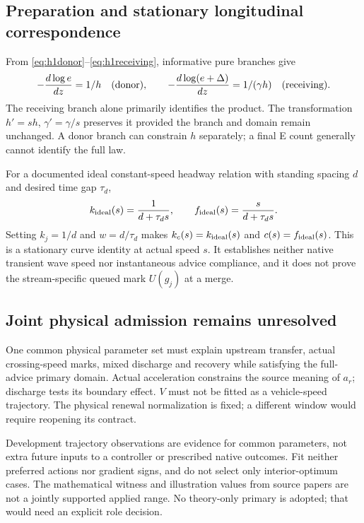 \subsection{Preparation and stationary longitudinal correspondence}
From \eqref{eq:h1donor}--\eqref{eq:h1receiving}, informative pure branches
give
\begin{equation}
 -\frac{d\log e}{dz}=1/h\quad\hbox{(donor)},\qquad
 -\frac{d\log(e+\Delta)}{dz}=1/(\gamma h)\quad\hbox{(receiving)}.
 \label{eq:prepidentify}
\end{equation}
The receiving branch alone primarily identifies the product. The
transformation $h'=sh$, $\gamma'=\gamma/s$ preserves it provided the
branch and domain remain unchanged. A donor branch can constrain $h$
separately; a final E count generally cannot identify the full law.

For a documented ideal constant-speed headway relation with standing
spacing $d$ and desired time gap $\tau_d$,
\begin{equation}
 k_{\rm ideal}(s)=\frac1{d+\tau_ds},\qquad
 f_{\rm ideal}(s)=\frac{s}{d+\tau_ds}. \label{eq:headway}
\end{equation}
Setting $k_j=1/d$ and $w=d/\tau_d$ makes
$k_c(s)=k_{\rm ideal}(s)$ and $c(s)=f_{\rm ideal}(s)$. This is a
stationary curve identity at actual speed $s$. It establishes neither
native transient wave speed nor instantaneous advice compliance, and it
does not prove the stream-specific queued mark $U(g_j)$ at a merge.

\subsection{Joint physical admission remains unresolved}
One common physical parameter set must explain upstream transfer, actual
crossing-speed marks, mixed discharge and recovery while satisfying the
full-advice primary domain. Actual acceleration constrains the source
meaning of $a_r$; discharge tests its boundary effect. $V$ must not be
fitted as a vehicle-speed trajectory. The physical renewal normalization
is fixed; a different window would require reopening its contract.

Development trajectory observations are evidence for common parameters,
not extra future inputs to a controller or prescribed native outcomes.
Fit neither preferred actions nor gradient signs, and do not select only
interior-optimum cases. The mathematical witness and illustration values
from source papers are not a jointly supported applied range. No
theory-only primary is adopted; that would need an explicit role decision.

